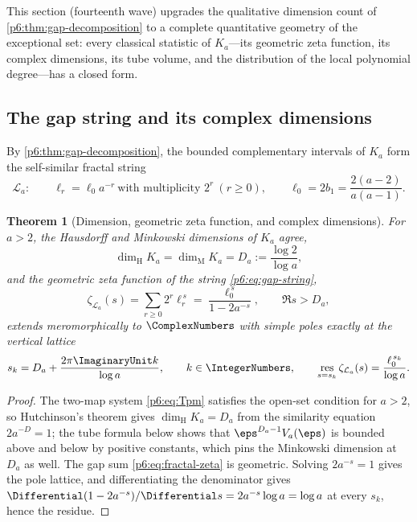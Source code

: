 \documentclass[11pt,oneside]{article}
\numberwithin{equation}{section}
\newtheorem{theorem}{Theorem}[section]
\theoremstyle{definition}
\theoremstyle{remark}
\begin{document}
This section (fourteenth wave) upgrades the qualitative dimension count of
\cref{p6:thm:gap-decomposition} to a complete quantitative geometry of the
exceptional set: every classical statistic of $K_a$---its geometric zeta
function, its complex dimensions, its tube volume, and the distribution of the
local polynomial degree---has a closed form.

\subsection{The gap string and its complex dimensions}

By \cref{p6:thm:gap-decomposition}, the bounded complementary intervals of
$K_a$ form the self-similar fractal string
\begin{equation}\label{p6:eq:gap-string}
 \mathcal L_a:\qquad
 \ell_r=\ell_0a^{-r}
 \ \text{with multiplicity }2^r
 \ (r\ge0),
 \qquad
 \ell_0=2b_1=\frac{2(a-2)}{a(a-1)}.
\end{equation}

\begin{theorem}[Dimension, geometric zeta function, and complex dimensions]
\label{p6:thm:complex-dimensions}
For $a>2$, the Hausdorff and Minkowski dimensions of $K_a$ agree,
\begin{equation}\label{p6:eq:minkowski-dimension}
 \dim_{\mathrm H}K_a=\dim_{\mathrm M}K_a=D_a:=\frac{\log2}{\log a},
\end{equation}
and the geometric zeta function of the string \eqref{p6:eq:gap-string},
\begin{equation}\label{p6:eq:fractal-zeta}
 \zeta_{\mathcal L_a}(s)
 =\sum_{r\ge0}2^r\ell_r^{\,s}
 =\frac{\ell_0^{\,s}}{1-2a^{-s}},
 \qquad\Re s>D_a,
\end{equation}
extends meromorphically to $\ComplexNumbers$ with simple poles exactly at the vertical
lattice
\begin{equation}\label{p6:eq:complex-dimensions}
 s_k=D_a+\frac{2\pi\ImaginaryUnit k}{\log a},
 \qquad k\in\IntegerNumbers,
 \qquad
 \operatorname*{res}_{s=s_k}\zeta_{\mathcal L_a}(s)
 =\frac{\ell_0^{\,s_k}}{\log a}.
\end{equation}
\end{theorem}

\begin{proof}
The two-map system \eqref{p6:eq:Tpm} satisfies the open-set condition for
$a>2$, so Hutchinson's theorem \cite{p6:hutchinson} gives
$\dim_{\mathrm H}K_a=D_a$ from the similarity equation $2a^{-D}=1$; the tube
formula below shows that $\eps^{D_a-1}V_a(\eps)$ is bounded above and below by
positive constants, which pins the Minkowski dimension at $D_a$ as well.  The
gap sum \eqref{p6:eq:fractal-zeta} is geometric.  Solving $2a^{-s}=1$ gives the
pole lattice, and differentiating the denominator gives
$\Differential(1-2a^{-s})/\Differential s=2a^{-s}\log a=\log a$ at every $s_k$, hence the residue.
\end{proof}
\end{document}
